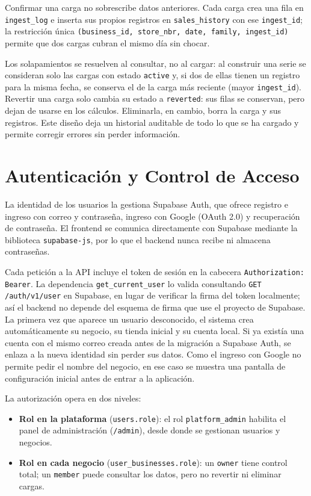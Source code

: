 \documentclass[12pt, a4paper]{report}
\begin{document}
Confirmar una carga no sobrescribe datos anteriores. Cada carga crea una fila en
\texttt{ingest\_log} e inserta sus propios registros en \texttt{sales\_history} con ese
\texttt{ingest\_id}; la restricción única \texttt{(business\_id, store\_nbr, date, family,
ingest\_id)} permite que dos cargas cubran el mismo día sin chocar.

Los solapamientos se resuelven al consultar, no al cargar: al construir una serie se
consideran solo las cargas con estado \texttt{active} y, si dos de ellas tienen un registro
para la misma fecha, se conserva el de la carga más reciente (mayor \texttt{ingest\_id}).
Revertir una carga solo cambia su estado a \texttt{reverted}: sus filas se conservan,
pero dejan de usarse en los cálculos. Eliminarla, en cambio, borra la carga y sus registros. Este diseño deja un historial
auditable de todo lo que se ha cargado y permite corregir errores sin perder información.

\section{Autenticación y Control de Acceso}

La identidad de los usuarios la gestiona Supabase Auth, que ofrece registro e ingreso con
correo y contraseña, ingreso con Google (OAuth 2.0) y recuperación de contraseña. El
frontend se comunica directamente con Supabase mediante la biblioteca
\texttt{supabase-js}, por lo que el backend nunca recibe ni almacena contraseñas.

Cada petición a la API incluye el token de sesión en la cabecera
\texttt{Authorization: Bearer}. La dependencia \texttt{get\_current\_user} lo valida
consultando \texttt{GET /auth/v1/user} en Supabase, en lugar de verificar la firma del
token localmente; así el backend no depende del esquema de firma que use el proyecto de
Supabase. La primera vez que aparece un usuario desconocido, el sistema crea
automáticamente su negocio, su tienda inicial y su cuenta local. Si ya existía una cuenta
con el mismo correo creada antes de la migración a Supabase Auth, se enlaza a la nueva
identidad sin perder sus datos. Como el ingreso con Google no permite pedir el nombre del
negocio, en ese caso se muestra una pantalla de configuración inicial antes de entrar a la
aplicación.

La autorización opera en dos niveles:

\begin{itemize}
  \item \textbf{Rol en la plataforma} (\texttt{users.role}): el rol \texttt{platform\_admin}
        habilita el panel de administración (\texttt{/admin}), desde donde se gestionan
        usuarios y negocios.
  \item \textbf{Rol en cada negocio} (\texttt{user\_businesses.role}): un \texttt{owner}
        tiene control total; un \texttt{member} puede consultar los datos, pero no revertir
        ni eliminar cargas.
\end{itemize}
\end{document}
